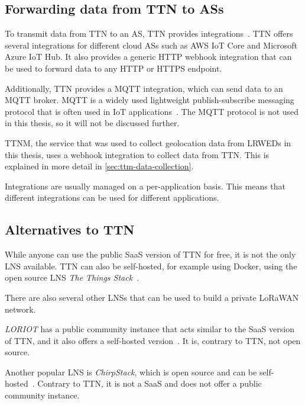 \subsection{Forwarding data from \acl{TTN} to \aclp{AS}}\label{sec:forwarding-data-from-ttn-to-as}

To transmit data from \ac{TTN} to an \ac{AS}, \ac{TTN} provides integrations~\cite{the_things_network_integrations_2021}.
\ac{TTN} offers several integrations for different cloud \acp{AS} such as \ac{AWS} IoT Core and Microsoft Azure IoT Hub.
It also provides a generic \ac{HTTP} webhook integration that can be used to forward data to any \ac{HTTP} or \ac{HTTPS} endpoint.

Additionally, \ac{TTN} provides a MQTT integration, which can send data to an MQTT broker.
MQTT is a widely used lightweight publish-subscribe messaging protocol that is often used in \ac{IoT} applications~\cite{mqtt_mqtt_2022}.
The MQTT protocol is not used in this thesis, so it will not be discussed further.

\ac{TTNM}, the service that was used to collect geolocation data from \aclp{LRWED} in this thesis, uses a webhook integration to collect data from \ac{TTN}.
This is explained in more detail in \cref{sec:ttm-data-collection}.

Integrations are usually managed on a per-application basis.
This means that different integrations can be used for different applications.

\subsection{Alternatives to \acl{TTN}}

While anyone can use the public \ac{SaaS} version of \ac{TTN} for free, it is not the only \ac{LNS} available.
\ac{TTN} can also be self-hosted, for example using Docker, using the open source \ac{LNS} \emph{The Things Stack}~\cite{the_things_network_host_2023}.

There are also several other \acp{LNS} that can be used to build a private \ac{LoRaWAN} network.

\emph{LORIOT} has a public community instance that acts similar to the \ac{SaaS} version of \ac{TTN}, and it also offers a self-hosted version~\cite{loriot_ag_loriot_2023}.
It is, contrary to \ac{TTN}, not open source.

Another popular \ac{LNS} is \emph{ChirpStack}, which is open source and can be self-hosted~\cite{chirpstack_chirpstack_2023}.
Contrary to \ac{TTN}, it is not a \ac{SaaS} and does not offer a public community instance.

